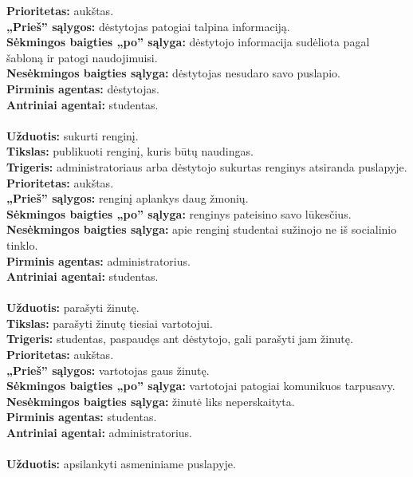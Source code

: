 \documentclass{VUMIFPSkursinis}
\begin{document}
\textbf{Prioritetas:} aukštas. \\
\textbf{„Prieš” sąlygos:} dėstytojas patogiai talpina informaciją.\\
\textbf{Sėkmingos baigties „po” sąlyga:} dėstytojo informacija sudėliota pagal šabloną ir patogi naudojimuisi. \\
\textbf{Nesėkmingos baigties sąlyga:} dėstytojas nesudaro savo puslapio. \\
\textbf{Pirminis agentas:} dėstytojas. \\
\textbf{Antriniai agentai:} studentas. \\
\\
\textbf{Užduotis:} sukurti renginį. \\
\textbf{Tikslas:} publikuoti renginį, kuris būtų naudingas.\\
\textbf{Trigeris:} administratoriaus arba dėstytojo sukurtas renginys atsiranda puslapyje. \\
\textbf{Prioritetas:} aukštas. \\
\textbf{„Prieš” sąlygos:} renginį aplankys daug žmonių.\\
\textbf{Sėkmingos baigties „po” sąlyga:} renginys pateisino savo lūkesčius. \\
\textbf{Nesėkmingos baigties sąlyga:} apie renginį studentai sužinojo ne iš socialinio tinklo. \\
\textbf{Pirminis agentas:} administratorius. \\
\textbf{Antriniai agentai:} studentas. \\
\\
\textbf{Užduotis:} parašyti žinutę. \\
\textbf{Tikslas:} parašyti žinutę tiesiai vartotojui.\\
\textbf{Trigeris:} studentas, paspaudęs ant dėstytojo, gali parašyti jam žinutę. \\
\textbf{Prioritetas:} aukštas. \\
\textbf{„Prieš” sąlygos:} vartotojas gaus žinutę.\\
\textbf{Sėkmingos baigties „po” sąlyga:} vartotojai patogiai komunikuos tarpusavy. \\
\textbf{Nesėkmingos baigties sąlyga:} žinutė liks neperskaityta. \\
\textbf{Pirminis agentas:} studentas. \\
\textbf{Antriniai agentai:} administratorius.\\
\\
\textbf{Užduotis:} apsilankyti asmeniniame puslapyje. \\
\end{document}
